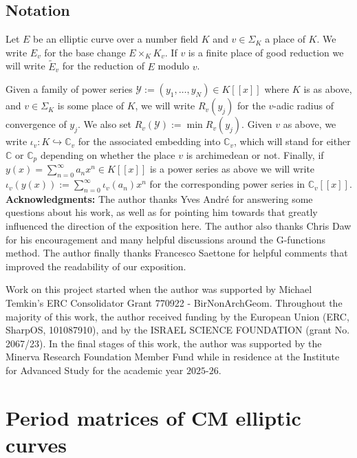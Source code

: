 \documentclass[12pt,twoside,a4paper]{article}
\theoremstyle{plain}%
\newcommand{\Sum}[2]{\displaystyle\sum_{#1}^{#2}}
\newcommand{\C}{\mathbb{C}}
\newcommand{\ld}{,\ldots,}
\begin{document}
\subsection{Notation}
Let $E$ be an elliptic curve over a number field $K$ and $v\in\Sigma_{K}$ a place of $K$. We write $E_v$ for the base change $E\times_{K} K_v$. If $v$ is a finite place of good reduction we will write $\tilde{E}_v$ for the reduction of $E$ modulo $v$. 

Given a family of power series $\mathcal{Y}:=(y_1\ld y_N)\in K[[x]]$ where $K$ is as above, and $v\in \Sigma_{K}$ is some place of $K$, we will write $R_v(y_{j})$ for the $v$-adic radius of convergence of $y_j$. We also set $R_{v}(\mathcal{Y}):=\min R_v(y_j)$. Given $v$ as above, we write $\iota_v:K\hookrightarrow \C_v$ for the associated embedding into $\C_v$, which will stand for either $\C$ or $\C_p$ depending on whether the place $v$ is archimedean or not. Finally, if $y(x)=\Sum{n=0}{\infty}a_n x^n\in K[[x]]$ is a power series as above we will write $\iota_v(y(x)):=\Sum{n=0}{\infty}\iota_v(a_n)x^n$ for the corresponding power series in $\C_v[[x]]$.\\

\textbf{Acknowledgments:} The author thanks Yves Andr\'e for answering some questions about his work, as well as for pointing him towards \cite{grosszagier} that greatly influenced the direction of the exposition here. The author also thanks Chris Daw for his encouragement and many helpful discussions around the G-functions method. The author finally thanks Francesco Saettone for helpful comments that improved the readability of our exposition.

Work on this project started when the author was supported by Michael Temkin's ERC Consolidator Grant 770922 - BirNonArchGeom. Throughout the majority of this work, the author received funding by the European Union (ERC, SharpOS, 101087910), and by the ISRAEL SCIENCE FOUNDATION (grant No. 2067/23). In the final stages of this work, the author was supported by the Minerva Research Foundation Member Fund while in residence at the Institute for Advanced Study for the academic year $2025$-$26$. 

\section{Period matrices of CM elliptic curves}\label{section:background}
\end{document}
